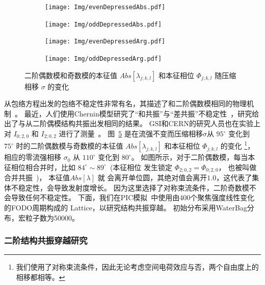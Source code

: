 \begin{figure}
    \centering
    \begin{subfigure}[b]{0.48\textwidth}
        \texttt{[image: Img/evenDepressedAbs.pdf]}
        \caption{}
        \label{sfig:stopbandEvenAbs}
    \end{subfigure}
    \begin{subfigure}[b]{0.48\textwidth}
        \texttt{[image: Img/oddDepressedAbs.pdf]}
        \caption{}
        \label{sfig:stopbandOddAbs}
    \end{subfigure}

    \begin{subfigure}[b]{0.48\textwidth}
        \texttt{[image: Img/evenDepressedArg.pdf]}
        \caption{}
        \label{sfig:stopbandEvenArg}
    \end{subfigure}
    \begin{subfigure}[b]{0.48\textwidth}
        \texttt{[image: Img/oddDepressedArg.pdf]}
        \caption{}
        \label{sfig:stopbandOddArg}
    \end{subfigure}
    \caption{二阶偶数模和奇数模的本征值 $Abs[\lambda_{j;k,l}]$ 和本征相位 $\Phi_{j;k,l}$ 随压缩相移 $\sigma$ 的变化}
    \label{fig:stopband}
\end{figure}

从包络方程出发的包络不稳定性非常有名，其描述了和二阶偶数模相同的物理机制~\cite{11,12,18}。
最近，人们使用Chernin模型研究了“和共振”与“差共振”不稳定性~\cite{21,22}，研究给出了与从二阶偶模结构共振出发相同的结果。
GSI和CERN的研究人员也在实验上对 $I_{0;2,0}$ 和 $I_{2;0,2}$ 进行了测量~\cite{singh2014observations,cernAdrian}。
图~\ref{fig:stopband} 是在流强不变而压缩相移$\sigma$从 $95^{\circ}$
变化到 $75^{\circ}$ 时的二阶偶数模与奇数模的本征值 $Abs[\lambda_{j;k,l}]$ 和本征相位 $\Phi_{j;k,l}$ 的变化
\footnote{我们使用了对称束流条件，因此无论考虑空间电荷效应与否，两个自由度上的相移都相等。}，
相应的零流强相移 $\sigma_0$ 从 $110^{\circ}$ 变化到 $80^{\circ}$。
如图所示，对于二阶偶数模，每当本征相位相合并时，比如 $84^\circ \sim 89^\circ$~(本征相位
发生锁定 $\Phi_{2;0,2}=\Phi_{0;2,0}$， 也被叫做合并共振~\cite{12})， 本征值$Abs[\lambda]$ 就
会离开单位圆，其绝对值会离开$1.0$，这代表了集体不稳定性，会导致发射度增长。
因为这里选择了对称束流条件，二阶奇数模不会导致任何不稳定性。
下面，我们在PIC模拟~\cite{23,24}中使用由400个聚焦强度线性变化的FODO周期构成的 Lattice，以研究结构共振穿越。
初始分布采用WaterBag分布，宏粒子数为50000。


\subsubsection{二阶结构共振穿越研究}

